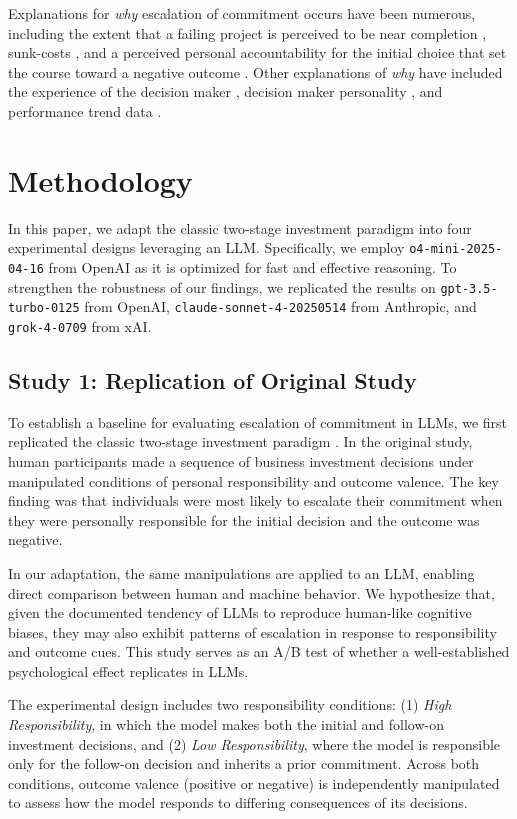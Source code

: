 \documentclass[letterpaper]{article} %
\begin{document}
Explanations for \textit{why} escalation of commitment occurs have been numerous, including the extent that a failing project is perceived to be near completion \cite{Conlon-1993}, sunk-costs \cite{Arkes-1985, Thaler-1980}, and a perceived personal accountability for the initial choice that set the course toward a negative outcome \cite{Staw-1976}. Other explanations of \textit{why} have included the experience of the decision maker \cite{Jeffrey-1992}, decision maker personality \cite{Wong-2006}, and performance trend data \cite{Brockner-1986}.

\section{Methodology}

In this paper, we adapt the classic two-stage investment paradigm \cite{Staw-1976} into four experimental designs leveraging an LLM. Specifically, we employ \texttt{o4-mini-2025-04-16} from OpenAI as it is optimized for fast and effective reasoning. To strengthen the robustness of our findings, we replicated the results on \texttt{gpt-3.5-turbo-0125} from OpenAI, \texttt{claude-sonnet-4-20250514} from Anthropic, and \texttt{grok-4-0709} from xAI.

\subsection{Study 1: Replication of Original Study}

To establish a baseline for evaluating escalation of commitment in LLMs, we first replicated the classic two-stage investment paradigm \cite{Staw-1976}. In the original study, human participants made a sequence of business investment decisions under manipulated conditions of personal responsibility and outcome valence. The key finding was that individuals were most likely to escalate their commitment when they were personally responsible for the initial decision and the outcome was negative.

In our adaptation, the same manipulations are applied to an LLM, enabling direct comparison between human and machine behavior. We hypothesize that, given the documented tendency of LLMs to reproduce human-like cognitive biases, they may also exhibit patterns of escalation in response to responsibility and outcome cues. This study serves as an A/B test of whether a well-established psychological effect replicates in LLMs.

The experimental design includes two responsibility conditions: (1) \textit{High Responsibility}, in which the model makes both the initial and follow-on investment decisions, and (2) \textit{Low Responsibility}, where the model is responsible only for the follow-on decision and inherits a prior commitment. Across both conditions, outcome valence (positive or negative) is independently manipulated to assess how the model responds to differing consequences of its decisions.
\end{document}
